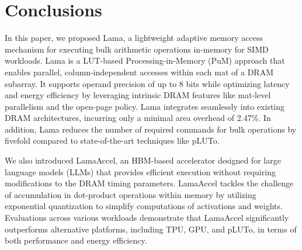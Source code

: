 \section{Conclusions}
In this paper, we proposed Lama, a lightweight adaptive memory access mechanism for executing bulk arithmetic operations in-memory for SIMD workloads. Lama is a LUT-based Processing-in-Memory (PuM) approach that enables parallel, column-independent accesses within each mat of a DRAM subarray. It supports operand precision of up to 8 bits while optimizing latency and energy efficiency by leveraging intrinsic DRAM features like mat-level parallelism and the open-page policy. Lama integrates seamlessly into existing DRAM architectures, incurring only a minimal area overhead of 2.47\%. In addition, Lama reduces the number of required commands for bulk operations by fivefold compared to state-of-the-art techniques like pLUTo. 

We also introduced LamaAccel, an HBM-based accelerator designed for large language models (LLMs) that provides efficient execution without requiring modifications to the DRAM timing parameters. LamaAccel tackles the challenge of accumulation in dot-product operations within memory by utilizing exponential quantization to simplify computations of activations and weights. Evaluations across various workloads demonstrate that LamaAccel significantly outperforms alternative platforms, including TPU, GPU, and pLUTo, in terms of both performance and energy efficiency.
